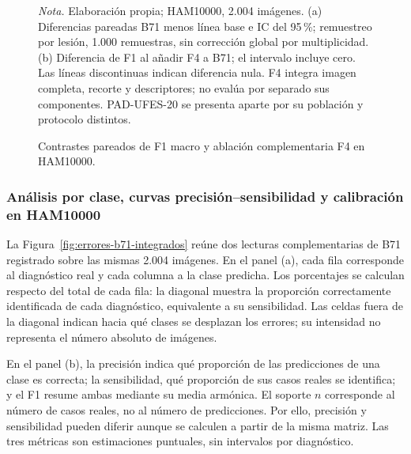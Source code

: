 \begin{figure}[!htbp]
\caption{Contrastes pareados de F1 macro y ablación complementaria F4 en HAM10000.}
\label{fig:contrastes-ham-baselines}
\label{fig:ablacion-f4}
\centering

\par\smallskip
{\singlespacing\fontsize{11}{13}\selectfont\raggedright
\noindent\textit{Nota.} Elaboración propia; HAM10000, 2.004 imágenes. (a) Diferencias pareadas B71 menos línea base e IC del 95\,\%; remuestreo por lesión, 1.000 remuestras, sin corrección global por multiplicidad. (b) Diferencia de F1 al añadir F4 a B71; el intervalo incluye cero. Las líneas discontinuas indican diferencia nula. F4 integra imagen completa, recorte y descriptores; no evalúa por separado sus componentes. PAD-UFES-20 se presenta aparte por su población y protocolo distintos.\par}
\end{figure}

\FloatBarrier
\subsubsection{Análisis por clase, curvas precisión--sensibilidad y calibración en HAM10000}

La Figura~\ref{fig:errores-b71-integrados} reúne dos lecturas complementarias de B71 registrado sobre las mismas 2.004 imágenes. En el panel (a), cada fila corresponde al diagnóstico real y cada columna a la clase predicha. Los porcentajes se calculan respecto del total de cada fila: la diagonal muestra la proporción correctamente identificada de cada diagnóstico, equivalente a su sensibilidad. Las celdas fuera de la diagonal indican hacia qué clases se desplazan los errores; su intensidad no representa el número absoluto de imágenes.

En el panel (b), la precisión indica qué proporción de las predicciones de una clase es correcta; la sensibilidad, qué proporción de sus casos reales se identifica; y el F1 resume ambas mediante su media armónica. El soporte $n$ corresponde al número de casos reales, no al número de predicciones. Por ello, precisión y sensibilidad pueden diferir aunque se calculen a partir de la misma matriz. Las tres métricas son estimaciones puntuales, sin intervalos por diagnóstico.

